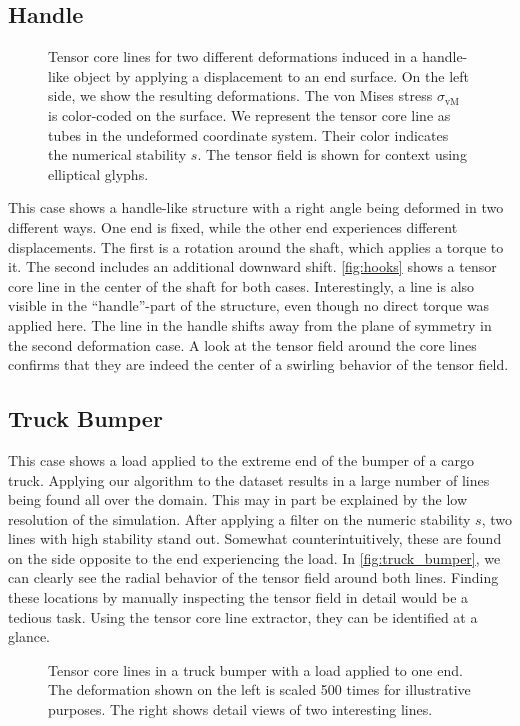 \subsection{Handle} %
\label{sub:hook}
%
\begin{figure}
    \centering
    \setlength\figurewidth\linewidth
    
    \caption{Tensor core lines for two different deformations induced in a
             handle-like object by applying a displacement to an end surface. On
             the left side, we show the resulting deformations. The von Mises
             stress $\sigma_{\text{vM}}$ is color-coded on the surface. We
             represent the tensor core line as tubes in the undeformed
             coordinate system. Their color indicates the numerical stability
             $s$. The tensor field is shown for context using elliptical
             glyphs.}
    \label{fig:hooks}
\end{figure}
%
This case shows a handle-like structure with a right angle being deformed in
two different ways.
%
One end is fixed, while the other end experiences different displacements.
%
The first is a rotation around the shaft, which applies a torque to it.
%
The second includes an additional downward shift.
%
\autoref{fig:hooks} shows a tensor core line in the center of the shaft for both
cases.
%
Interestingly, a line is also visible in the ``handle''-part of the structure,
even though no direct torque was applied here.
%
The line in the handle shifts away from the plane of symmetry in the second
deformation case.
%
A look at the tensor field around the core lines confirms that they are indeed
the center of a swirling behavior of the tensor field.
%
%
\subsection{Truck Bumper} %
\label{sub:truck_bumper}
%
This case shows a load applied to the extreme end of the bumper of a cargo
truck.
%
Applying our algorithm to the dataset results in a large number of lines being
found all over the domain.
%
This may in part be explained by the low resolution of the simulation.
%
After applying a filter on the numeric stability $s$, two lines with high
stability stand out.
%
Somewhat counterintuitively, these are found on the side opposite to the end
experiencing the load.
%
In \autoref{fig:truck_bumper}, we can clearly see the radial behavior of the
tensor field around both lines.
%
Finding these locations by manually inspecting the tensor field in detail would
be a tedious task.
%
Using the tensor core line extractor, they can be identified at a glance.
%
\begin{figure}
    \centering
    \setlength\figurewidth\linewidth
    
    \caption{Tensor core lines in a truck bumper with a load applied to one end.
             The deformation shown on the left is scaled 500 times for
             illustrative purposes. The right shows detail views of two
             interesting lines.}
    \label{fig:truck_bumper}
\end{figure}
%
%

